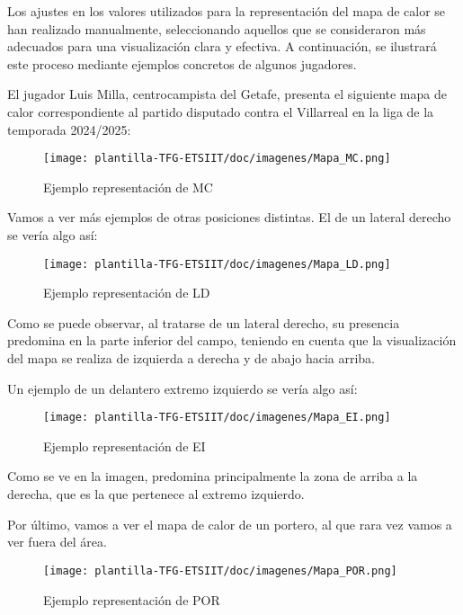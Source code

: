 Los ajustes en los valores utilizados para la representación del mapa de calor se han realizado manualmente, seleccionando aquellos que se consideraron más adecuados para una visualización clara y efectiva. A continuación, se ilustrará este proceso mediante ejemplos concretos de algunos jugadores.

El jugador Luis Milla, centrocampista del Getafe, presenta el siguiente mapa de calor correspondiente al partido disputado contra el Villarreal en la liga de la temporada 2024/2025:

\begin{figure}[H]
    \centering
    \texttt{[image: plantilla-TFG-ETSIIT/doc/imagenes/Mapa\_MC.png]}
    \caption{Ejemplo representación de MC}
    \label{fig:etiqueta-imagen}
\end{figure}

Vamos a ver más ejemplos de otras posiciones distintas. El de un lateral derecho se vería algo así:

\begin{figure}[H]
    \centering
    \texttt{[image: plantilla-TFG-ETSIIT/doc/imagenes/Mapa\_LD.png]}
    \caption{Ejemplo representación de LD}
    \label{fig:etiqueta-imagen}
\end{figure}

Como se puede observar, al tratarse de un lateral derecho, su presencia predomina en la parte inferior del campo, teniendo en cuenta que la visualización del mapa se realiza de izquierda a derecha y de abajo hacia arriba.

Un ejemplo de un delantero extremo izquierdo se vería algo así:

\begin{figure}[H]
    \centering
    \texttt{[image: plantilla-TFG-ETSIIT/doc/imagenes/Mapa\_EI.png]}
    \caption{Ejemplo representación de EI}
    \label{fig:etiqueta-imagen}
\end{figure}

Como se ve en la imagen, predomina principalmente la zona de arriba a la derecha, que es la que pertenece al extremo izquierdo.

Por último, vamos a ver el mapa de calor de un portero, al que rara vez vamos a ver fuera del área.

\begin{figure}[H]
    \centering
    \texttt{[image: plantilla-TFG-ETSIIT/doc/imagenes/Mapa\_POR.png]}
    \caption{Ejemplo representación de POR}
    \label{fig:etiqueta-imagen}
\end{figure}

